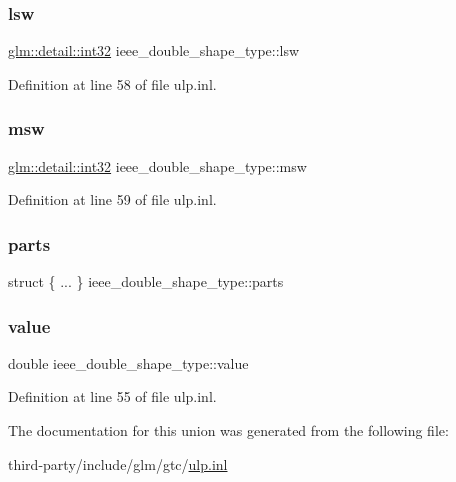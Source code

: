 \subsubsection{\texorpdfstring{lsw}{lsw}}
{\footnotesize\ttfamily \hyperlink{namespaceglm_1_1detail_a9f85b4efeca416cdcec2fd08939a2e17}{glm\+::detail\+::int32} ieee\+\_\+double\+\_\+shape\+\_\+type\+::lsw}



Definition at line 58 of file ulp.\+inl.

\mbox{\label{unionieee__double__shape__type_aea1156759f6afd58a56a7b4e7bfcee01}} 
\subsubsection{\texorpdfstring{msw}{msw}}
{\footnotesize\ttfamily \hyperlink{namespaceglm_1_1detail_a9f85b4efeca416cdcec2fd08939a2e17}{glm\+::detail\+::int32} ieee\+\_\+double\+\_\+shape\+\_\+type\+::msw}



Definition at line 59 of file ulp.\+inl.

\mbox{\label{unionieee__double__shape__type_a6040e16c8358a21f8e91a578384ead5b}} 
\subsubsection{\texorpdfstring{parts}{parts}}
{\footnotesize\ttfamily struct \{ ... \}   ieee\+\_\+double\+\_\+shape\+\_\+type\+::parts}

\mbox{\label{unionieee__double__shape__type_a2d9c4cab9e3fa74e4be6d72f798a145b}} 
\subsubsection{\texorpdfstring{value}{value}}
{\footnotesize\ttfamily double ieee\+\_\+double\+\_\+shape\+\_\+type\+::value}



Definition at line 55 of file ulp.\+inl.



The documentation for this union was generated from the following file\+:\begin{DoxyCompactItemize}
\item 
third-\/party/include/glm/gtc/\hyperlink{ulp_8inl}{ulp.\+inl}\end{DoxyCompactItemize}

